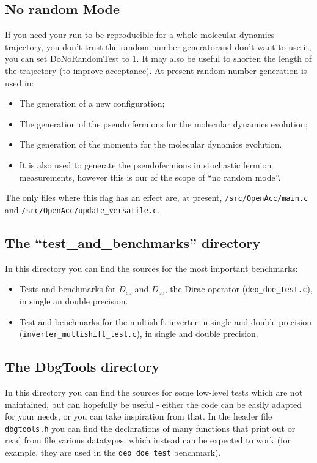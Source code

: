 \subsection{ No random Mode}
If you need your run to be reproducible for a whole molecular dynamics 
trajectory, you don't trust the random number generatorand don't want to use 
it, you can set \textsf{ DoNoRandomTest } to 1. It may also be useful to shorten the length of the trajectory (to improve acceptance).
At present random number generation is used in:
\begin{itemize}
    \item The generation of a new configuration;
    \item The generation of the pseudo fermions for the molecular dynamics 
        evolution;
    \item The generation of the momenta for the molecular dynamics evolution.
    \item It is also used to generate the pseudofermions in stochastic fermion 
        measurements, however this is our of the scope of ``no random mode''.
\end{itemize}
The only files where this flag has an effect are, at present, 
\verb|/src/OpenAcc/main.c| and \verb|/src/OpenAcc/update_versatile.c|. 


\subsection{The ``test\_and\_benchmarks'' directory}
In this directory you can find the sources for the most important benchmarks:
\begin{itemize}
    \item Tests and benchmarks for $D_{eo}$ and $D_{oe}$, the Dirac 
        operator (\verb|deo_doe_test.c|), in single an double precision.
    \item Test and benchmarks for the multishift inverter in single and double 
precision (\verb|inverter_multishift_test.c|), in single and double precision. 
\end{itemize}

\subsection{The DbgTools directory}
In this directory you can find the sources for some low-level tests
which are not maintained, but can hopefully be useful - either the code can be easily 
adapted for your needs, or you can take inspiration from that. 
In the header file \verb|dbgtools.h| you can find the declarations of many 
functions that print out or read from file various datatypes, which instead can be expected 
to work (for example, they are used in the \verb|deo_doe_test| benchmark).


